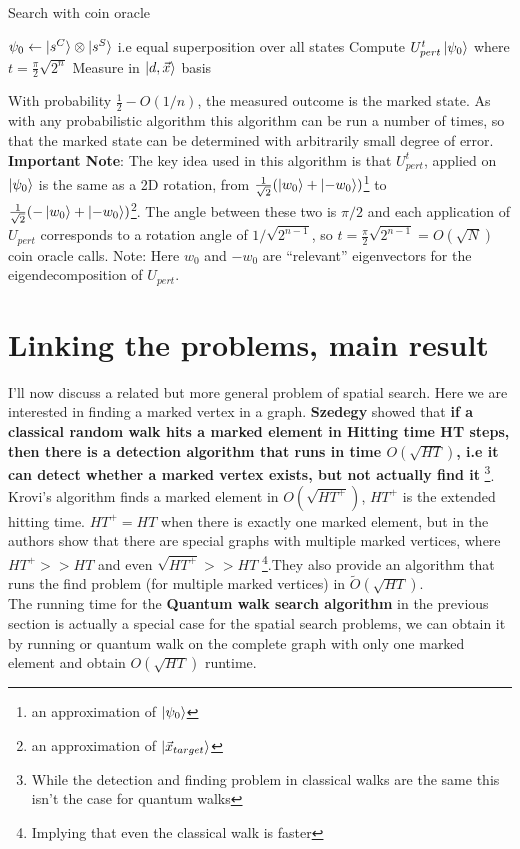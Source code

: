 \documentclass{article}
\begin{document}
\begin{algorithm}[H]
\caption{Search with coin oracle}\label{alg:q1}
\begin{algorithmic}[1]
\State $\psi_0 \gets \ket{s^C} \otimes \ket{s^S}$ i.e equal superposition over all states
\State Compute $U_{pert}^t \ket{\psi_0}$ where $t =\frac{\pi}{2}\sqrt{2^n}$
\State Measure in $\ket{d,\vec{x}}$ basis
\EndProcedure
\end{algorithmic}
\end{algorithm}

With probability $\frac{1}{2} - O(1/n)$, the measured outcome is the marked state. As with any probabilistic algorithm this algorithm can be run a number of times, so that the marked state can be determined with arbitrarily small degree of error.\\

\textbf{Important Note}: The key idea used in this algorithm is that $U_{pert}^t$, applied on $\ket{\psi_0}$ is the same as a 2D rotation, from $\frac{1}{\sqrt{2}}(\ket{w_0} + \ket{-w_0})$\footnote{an approximation of $\ket{\psi_0}$} to $\frac{1}{\sqrt{2}}(-\ket{w_0} + \ket{-w_0})$\footnote{an approximation of $\ket{\vec{x}_{target}}$}. The angle between these two is $\pi/2$ and each application of $U_{pert}$ corresponds to a rotation angle of $1/\sqrt{2^{n-1}}$, so $t = \frac{\pi}{2} \sqrt{2^{n-1}} = O(\sqrt{N})$ coin oracle calls. Note: Here $w_0$ and $-w_0$ are ``relevant'' eigenvectors for the eigendecomposition of $U_{pert}$.

\section{Linking the problems, main result}

I'll now discuss a related but more general problem of spatial search. Here we are interested in finding a marked vertex in a graph. \textbf{Szedegy} \cite{Szegedy2004QuantumSO} showed that \textbf{if a classical random walk hits a marked element in Hitting time \textbf{HT} steps, then there is a detection algorithm that runs in time $O(\sqrt{HT})$, i.e it can detect whether a marked vertex exists, but not actually find it }\footnote{While the detection and finding problem in classical walks are the same this isn't the case for quantum walks}. Krovi's\cite{Krovi2015QuantumWC} algorithm finds a marked element in $O(\sqrt{HT^+})$,  $HT^{+}$ is the extended hitting time. $HT^+ = HT$ when there is exactly one marked element, but in \cite{Ambainis2019QuadraticSF} the authors show that there are special graphs with multiple marked vertices, where $HT^+ >> HT$ and even $\sqrt{HT^+} >> HT$ \footnote{Implying that even the classical walk is faster}.They also provide an algorithm that runs the find problem (for multiple marked vertices) in $\tilde{O}(\sqrt{HT})$.\\
The running time for the \textbf{Quantum walk search algorithm} in the previous section is actually a special case for the spatial search problems, we can obtain it by running \cite{Krovi2015QuantumWC} or \cite{Ambainis2019QuadraticSF} quantum walk on the complete graph with only one marked element and obtain $O(\sqrt{HT})$ runtime. 
\end{document}
